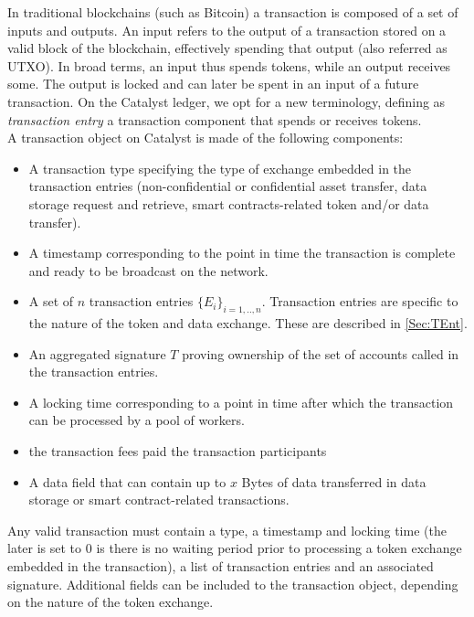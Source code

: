 In traditional blockchains (such as Bitcoin) a transaction is composed of a set of inputs and outputs. An input refers to the output of a transaction stored on a valid block of the blockchain, effectively spending that output (also referred as UTXO). In broad terms, an input thus spends tokens, while an output receives some. The output is locked and can later be spent in an input of a future transaction. On the Catalyst ledger, we opt for a new terminology, defining as \textit{transaction entry} a transaction component that spends or receives tokens.\\

A transaction object on Catalyst is made of the following components:

\begin{itemize}
\item A transaction type specifying the type of exchange embedded in the transaction entries (non-confidential or confidential asset transfer, data storage request and retrieve, smart contracts-related token and/or data transfer).      
\item A timestamp corresponding to the point in time the transaction is complete and ready to be broadcast on the network.
\item A set of $n$ transaction entries $\{E_i\}_{i=1,..,n}$. Transaction entries are specific to the nature of the token and data exchange. These are described in \ref{Sec:TEnt}.
\item An aggregated signature $T$ proving ownership of the set of accounts called in the transaction entries.
\item A locking time corresponding to a point in time after which the transaction can be processed by a pool of workers.
\item the transaction fees paid the transaction participants
\item A data field that can contain up to $x$ Bytes of data transferred in data storage or smart contract-related transactions. 
\end{itemize}

Any valid transaction must contain a type, a timestamp and locking time (the later is set to 0 is there is no waiting period prior to processing a token exchange embedded in the transaction), a list of transaction entries and an associated signature. Additional fields can be included to the transaction object, depending on the nature of the token exchange. 